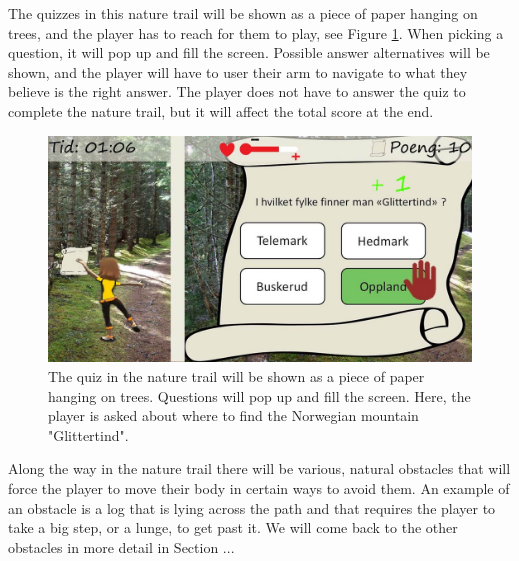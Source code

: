 The quizzes  in this nature trail will be shown as a piece of paper hanging on trees, and the player has to reach for them to play, see Figure \ref{fig:quiz}. When picking a question, it will pop up and fill the screen. Possible answer alternatives will be shown, and the player will have to user their arm to navigate to what they believe is the right answer. The player does not have to answer the quiz to complete the nature trail, but it will affect the total score at the end. 

\begin{figure} [H]
\centering
\includegraphics[scale=0.5]{quiz.jpg}
\caption[Nature trail - quiz]{The quiz in the nature trail will be shown as a piece of paper hanging on trees. Questions will pop up and fill the screen. Here, the player is asked about where to find the Norwegian mountain "Glittertind".}
\label{fig:quiz}
\end{figure} 

Along the way in the nature trail there will be various, natural obstacles that will force the player to move their body in certain ways to avoid them. An example of an obstacle is a log that is lying across the path and that requires the player to take a big step, or a lunge, to get past it. We will come back to the other obstacles in more detail in Section ... 

